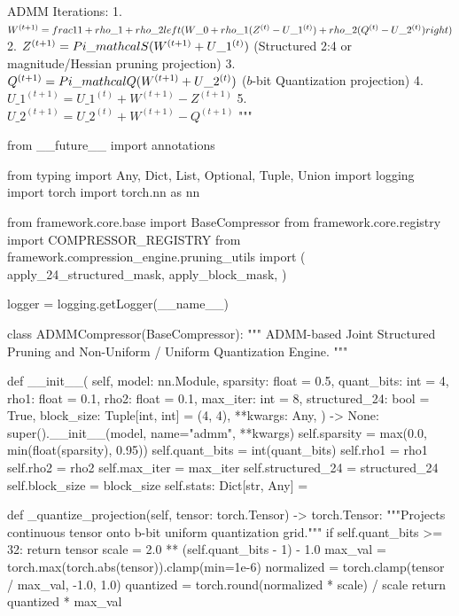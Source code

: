 ADMM Iterations:
1. $W^{(t+1)} = \\frac{1}{1 + \\rho\_1 + \\rho\_2} \\left( W\_0 + \\rho\_1 (Z^{(t)} - U\_1^{(t)}) + \\rho\_2 (Q^{(t)} - U\_2^{(t)}) \\right)$
2. $Z^{(t+1)} = \\Pi\_{\\mathcal{S}}(W^{(t+1)} + U\_1^{(t)})$ (Structured 2:4 or magnitude/Hessian pruning projection)
3. $Q^{(t+1)} = \\Pi\_{\\mathcal{Q}}(W^{(t+1)} + U\_2^{(t)})$ ($b$-bit Quantization projection)
4. $U\_1^{(t+1)} = U\_1^{(t)} + W^{(t+1)} - Z^{(t+1)}$
5. $U\_2^{(t+1)} = U\_2^{(t)} + W^{(t+1)} - Q^{(t+1)}$
"""

from \_\_future\_\_ import annotations

from typing import Any, Dict, List, Optional, Tuple, Union
import logging
import torch
import torch.nn as nn

from framework.core.base import BaseCompressor
from framework.core.registry import COMPRESSOR\_REGISTRY
from framework.compression\_engine.pruning\_utils import (
    apply\_24\_structured\_mask,
    apply\_block\_mask,
)

logger = logging.getLogger(\_\_name\_\_)


class ADMMCompressor(BaseCompressor):
    """
    ADMM-based Joint Structured Pruning and Non-Uniform / Uniform Quantization Engine.
    """

    def \_\_init\_\_(
        self,
        model: nn.Module,
        sparsity: float = 0.5,
        quant\_bits: int = 4,
        rho1: float = 0.1,
        rho2: float = 0.1,
        max\_iter: int = 8,
        structured\_24: bool = True,
        block\_size: Tuple[int, int] = (4, 4),
        **kwargs: Any,
    ) -> None:
        super().\_\_init\_\_(model, name="admm", **kwargs)
        self.sparsity = max(0.0, min(float(sparsity), 0.95))
        self.quant\_bits = int(quant\_bits)
        self.rho1 = rho1
        self.rho2 = rho2
        self.max\_iter = max\_iter
        self.structured\_24 = structured\_24
        self.block\_size = block\_size
        self.stats: Dict[str, Any] = {}

    def \_quantize\_projection(self, tensor: torch.Tensor) -> torch.Tensor:
        """Projects continuous tensor onto b-bit uniform quantization grid."""
        if self.quant\_bits >= 32:
            return tensor
        scale = 2.0 ** (self.quant\_bits - 1) - 1.0
        max\_val = torch.max(torch.abs(tensor)).clamp(min=1e-6)
        normalized = torch.clamp(tensor / max\_val, -1.0, 1.0)
        quantized = torch.round(normalized * scale) / scale
        return quantized * max\_val

